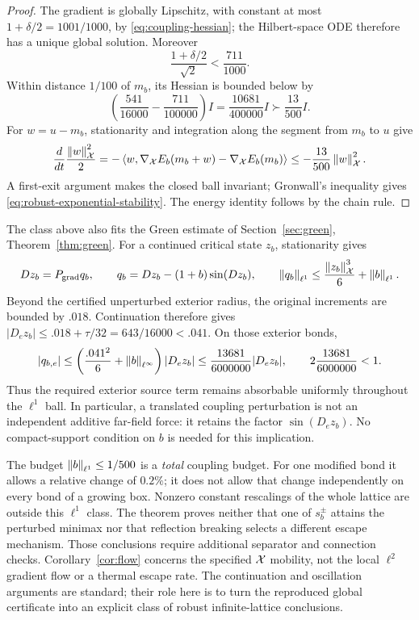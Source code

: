 \begin{proof}
The gradient is globally Lipschitz, with constant at most
$1+\delta/2=1001/1000$, by \eqref{eq:coupling-hessian}; the Hilbert-space
ODE therefore has a unique global solution. Moreover
\[
 \frac{1+\delta/2}{\sqrt2}<\frac{711}{1000}.
\]
Within distance $1/100$ of $m_b$, its Hessian is bounded below by
\[
 \left(\frac{541}{16000}-\frac{711}{100000}\right)I
 =\frac{10681}{400000}I\succ\frac{13}{500}I.
\]
For $w=u-m_b$, stationarity and integration along the segment from
$m_b$ to $u$ give
\[
 \frac{d}{dt}\frac{\left\lVert w\right\rVert_{\mathcal X}^2}{2}
 =-\left\langle w,\nabla_{\mathcal X}E_b(m_b+w)-\nabla_{\mathcal X}E_b(m_b)\right\rangle
 \le-\frac{13}{500}\left\lVert w\right\rVert_{\mathcal X}^2.
\]
A first-exit argument makes the closed ball invariant; Gronwall's
inequality gives \eqref{eq:robust-exponential-stability}. The energy
identity follows by the chain rule.
\end{proof}

\begin{remark}
The class above also fits the Green estimate of
Section~\ref{sec:green}, Theorem~\ref{thm:green}. For a continued critical
state $z_b$, stationarity gives
\[
 Dz_b=P_{\mathrm{grad}}q_b,\qquad
 q_b=Dz_b-(1+b)\sin(Dz_b),\qquad
 \left\lVert q_b\right\rVert_{\ell^1}\le\frac{\left\lVert z_b\right\rVert_{\mathcal X}^3}{6}
                         +\left\lVert b\right\rVert_{\ell^1}.
\]
Beyond the certified unperturbed exterior radius, the original increments
are bounded by $.018$. Continuation therefore gives
$|D_ez_b|\le .018+\tau/32=643/16000<.041$. On those exterior bonds,
\[
 |q_{b,e}|\le\left(\frac{.041^2}{6}+\left\lVert b\right\rVert_{\ell^\infty}\right)
                  |D_ez_b|
 \le\frac{13681}{6000000}|D_ez_b|,
 \qquad 2\frac{13681}{6000000}<1.
\]
Thus the required exterior source term remains absorbable uniformly
throughout the $\ell^1$ ball. In particular, a translated coupling
perturbation is not an independent additive far-field force: it retains
the factor $\sin(D_ez_b)$. No compact-support condition on $b$ is needed
for this implication.
\end{remark}

\begin{remark}
The budget $\left\lVert b\right\rVert_{\ell^1}\le1/500$ is a \emph{total} coupling budget.
For one modified bond it allows a relative change of $0.2\%$; it does
not allow that change independently on every bond of a growing box.
Nonzero constant rescalings of the whole lattice are outside this
$\ell^1$ class. The theorem proves neither that one of $s_b^{\pm}$
attains the perturbed minimax nor that reflection breaking selects a
different escape mechanism. Those conclusions require additional
separator and connection checks. Corollary~\ref{cor:flow} concerns the
specified $\mathcal X$ mobility, not the local $\ell^2$ gradient flow or a thermal
escape rate. The continuation and oscillation arguments are standard;
their role here is to turn the reproduced global certificate into an
explicit class of robust infinite-lattice conclusions.
\end{remark}
